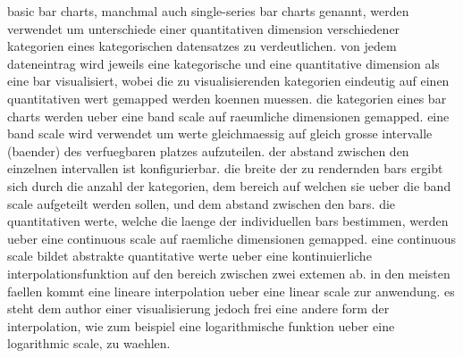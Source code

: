 basic bar charts, manchmal auch single-series bar charts genannt, werden verwendet um unterschiede einer quantitativen dimension verschiedener kategorien eines kategorischen datensatzes zu verdeutlichen.
von jedem dateneintrag wird jeweils eine kategorische und eine quantitative dimension als eine bar visualisiert, wobei die zu visualisierenden kategorien eindeutig auf einen quantitativen wert gemapped werden koennen muessen.
die kategorien eines bar charts werden ueber eine band scale auf raeumliche dimensionen gemapped.
eine band scale wird verwendet um werte gleichmaessig auf gleich grosse intervalle (baender) des verfuegbaren platzes aufzuteilen. 
der abstand zwischen den einzelnen intervallen ist konfigurierbar.
die breite der zu rendernden bars ergibt sich durch die anzahl der kategorien, dem bereich auf welchen sie ueber die band scale aufgeteilt werden sollen, und dem abstand zwischen den bars. 
die quantitativen werte, welche die laenge der individuellen bars bestimmen, werden ueber eine continuous scale auf raemliche dimensionen gemapped.
eine continuous scale bildet abstrakte quantitative werte ueber eine kontinuierliche interpolationsfunktion auf den bereich zwischen zwei extemen ab.
in den meisten faellen kommt eine lineare interpolation ueber eine linear scale zur anwendung.
es steht dem author einer visualisierung jedoch frei eine andere form der interpolation, wie zum beispiel eine logarithmische funktion ueber eine logarithmic scale, zu waehlen. 

